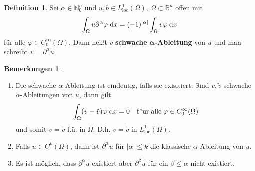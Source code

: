 \documentclass[
paper=a4,
bibtotocnumbered,
liststotocnumbered,
tablecaptionabove,
pointlessnumbers,
twoside,
openright,
10pt
]
{report}
\let\phi\varphi
\theoremstyle{definition}
\newtheorem*{df}{Definition}
\newtheorem*{rems}{Bemerkungen}
\numberwithin{equation}{chapter}
\begin{document}
\begin{df}
Sei $\alpha\in\mathbb{N}_0^n$ und $u,b\in L_{\mathrm{loc}}^1(\Omega)$, $\Omega\subset\mathbb{R}^n$ offen mit
\begin{equation}
\int_\Omega u\partial^\alpha\phi\d x= (-1)^{|\alpha|}\int_\Omega v\phi \d x
\end{equation}
für alle $\phi\in C_0^\infty(\Omega)$. Dann heißt $v$ \textbf{schwache} $\boldsymbol{\alpha}$\textbf{-Ableitung} von $u$ und man schreibt $v=\partial^\alpha u$.
\end{df}

\begin{rems}
\begin{enumerate}[\bf 1)]
\item Die schwache $\alpha$-Ableitung ist eindeutig, falls sie exisitiert: Sind $v,\tilde{v}$ schwache $\alpha$-Ableitungen von $u$, dann gilt
\begin{equation}
\int_\Omega (v-\tilde{v})\phi\d x =0\quad\mathrm{f"ur\; alle\;}\phi\in C_0^\infty(\Omega)
\end{equation}
und somit $v=\tilde{v}$ f.ü. in $\Omega$. D.h. $v=\tilde{v}$ in  $L_{\mathrm{loc}}^1(\Omega)$. 
\item Falls $u\in C^k(\Omega)$, dann ist $\partial^\alpha u$ für $|\alpha|\leq k$ die klassische $\alpha$-Ableitung von $u$.
\item Es ist möglich, dass $\partial^\alpha u$ existiert aber $\partial^\beta u$ für ein $\beta\leq \alpha$ nicht existiert.
\end{enumerate}
\end{rems}
\end{document}
